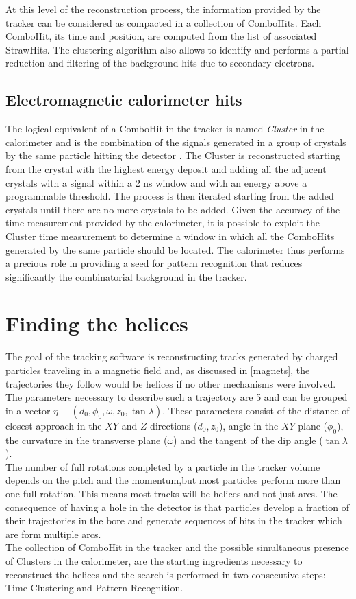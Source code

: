 \documentclass[12pt,a4paper,openright, oneside, titlepage]{book} %
\begin{document}
At this level of the reconstruction process, the information provided by the tracker can be considered as compacted
in a collection of ComboHits. Each ComboHit, its time and position, are computed from the list of associated StrawHits.
The clustering algorithm also allows to identify and  performs a partial reduction and filtering of the background hits due to secondary electrons.



\subsection{Electromagnetic calorimeter hits} 
The logical equivalent of a ComboHit in the tracker is named \textit{Cluster} 
in the calorimeter and is the combination of the signals generated in a group of crystals
by the same particle hitting the detector \cite{CalCluster_2} \cite{CalCluster}. 
The Cluster is reconstructed starting from the crystal with the highest energy deposit
and adding 
all the adjacent crystals with a signal within a 2 ns window and with an energy above a programmable threshold. 
The process is then iterated starting from the added crystals until there are no more crystals to be added.
Given the accuracy of the time measurement provided by the calorimeter,
it is possible to exploit the Cluster time measurement to determine a window
in which all the ComboHits generated by the same particle should be located.
The calorimeter thus performs a precious role in providing a seed for 
pattern recognition that reduces significantly the combinatorial background in the tracker.

 
\section{Finding the helices}
The goal of the tracking software is reconstructing tracks 
generated by charged particles traveling in a magnetic field and, 
as discussed in \ref{magnets}, the trajectories they follow would be helices if no other mechanisms were involved. 
The parameters necessary to describe such a trajectory are 5 and can be grouped in a vector $\eta \equiv ( d_0, \phi_0, \omega, z_0, \tan \lambda)$. 
These parameters consist of the distance of closest approach in the $XY$ and $Z$ directions ($d_0,z_0$), angle in the $XY$ plane ($\phi_0$), the curvature in the transverse plane ($\omega$) and the tangent of the dip angle ($\tan\lambda$).\\
The number of full rotations completed by a particle in the tracker volume depends on the pitch and the momentum,but most particles perform more than one full rotation. 
This means most tracks will be helices and not just arcs. 
The consequence of having a hole in the detector is that particles develop a fraction of their trajectories in the bore and generate sequences of hits in the tracker which are form multiple arcs.\\
The collection of ComboHit in the tracker and the possible simultaneous presence of Clusters in the calorimeter, are the starting ingredients necessary to reconstruct the helices and the search is performed in two consecutive steps: Time Clustering and Pattern Recognition.
\end{document}
